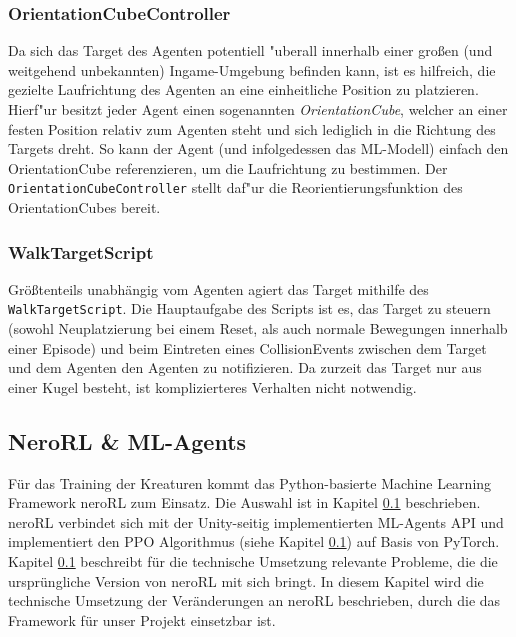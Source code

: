 \subsubsection{OrientationCubeController}

Da sich das Target des Agenten potentiell "uberall innerhalb einer großen (und weitgehend unbekannten) Ingame-Umgebung befinden kann, ist es hilfreich, die gezielte Laufrichtung des Agenten an eine einheitliche Position zu platzieren. Hierf"ur besitzt jeder Agent einen sogenannten \textit{OrientationCube}, welcher an einer festen Position relativ zum Agenten steht und sich lediglich in die Richtung des Targets dreht. So kann der Agent (und infolgedessen das ML-Modell) einfach den OrientationCube referenzieren, um die Laufrichtung zu bestimmen. Der \texttt{OrientationCubeController} stellt daf"ur die Reorientierungsfunktion des OrientationCubes bereit.


\subsubsection{WalkTargetScript}

Größtenteils unabhängig vom Agenten agiert das Target mithilfe des \texttt{WalkTargetScript}. Die Hauptaufgabe des Scripts ist es, das Target zu steuern (sowohl Neuplatzierung bei einem Reset, als auch normale Bewegungen innerhalb einer Episode) und beim Eintreten eines CollisionEvents zwischen dem Target und dem Agenten den Agenten zu notifizieren. Da zurzeit das Target nur aus einer Kugel besteht, ist komplizierteres Verhalten nicht notwendig.


\subsection{NeroRL \& ML-Agents}

Für das Training der Kreaturen kommt das Python-basierte Machine Learning Framework neroRL zum Einsatz. Die Auswahl ist in Kapitel \ref{} beschrieben. neroRL verbindet sich mit der Unity-seitig implementierten ML-Agents API und implementiert den PPO Algorithmus (siehe Kapitel \ref{}) auf Basis von PyTorch. Kapitel \ref{} beschreibt für die technische Umsetzung relevante Probleme, die die ursprüngliche Version von neroRL mit sich bringt. In diesem Kapitel wird die technische Umsetzung der Veränderungen an neroRL beschrieben, durch die das Framework für unser Projekt einsetzbar ist.

